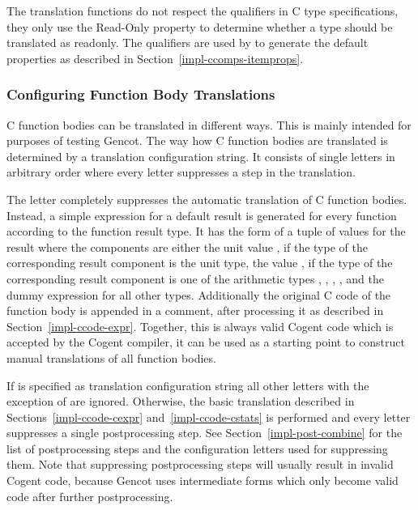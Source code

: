The translation functions do not respect the  qualifiers in C type specifications, they only use the 
Read-Only property to determine whether a type should be translated as readonly. The  qualifiers are 
used by  to generate the default properties as described in Section~\ref{impl-ccomps-itemprops}. 

\subsubsection{Configuring Function Body Translations}

C function bodies can be translated in different ways. This is mainly intended for purposes of testing Gencot.
The way how C function bodies are translated is determined by a translation configuration string. It consists of
single letters in arbitrary order where every letter suppresses a step in the translation.

The letter  completely suppresses the automatic translation of C function bodies. Instead, a simple
expression for a default result is generated for every function according to the function result type. It has
the form of a tuple of values for the result where the components are either the unit value \code{()}, if the
type of the corresponding result component is the unit type, the value , if the type of the corresponding
result component is one of the arithmetic types , , , , and the dummy
expression  for all other types. Additionally the original C code of the function body is
appended in a comment, after processing it as described in Section~\ref{impl-ccode-expr}. Together, this is always
valid Cogent code which is accepted by the Cogent compiler, it can be used as a starting point to construct manual
translations of all function bodies.

If  is specified as translation configuration string all other letters with the exception of  are
ignored. Otherwise, the basic translation described in Sections~\ref{impl-ccode-cexpr} and~\ref{impl-ccode-cstats}
is performed and every letter suppresses a single postprocessing step. See Section~\ref{impl-post-combine} for the
list of postprocessing steps and the configuration letters used for suppressing them. Note that suppressing
postprocessing steps will usually result in invalid Cogent code, because Gencot uses intermediate forms which only
become valid code after further postprocessing.

